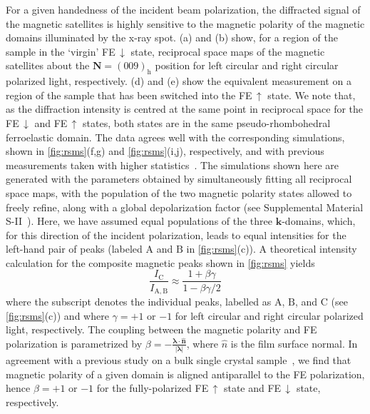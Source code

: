 \documentclass[aps,prb,twocolumn,showpacs,superscriptaddress, longbibliography, 10pt]{revtex4-1}
\begin{document}
{For a given handedness of the incident beam polarization, the diffracted signal of the magnetic satellites is highly sensitive to the magnetic polarity of the magnetic domains illuminated by the x-ray spot. (a) and (b) show, for a region of the sample in the `virgin' FE\,$\downarrow$ state, reciprocal space maps of the magnetic satellites about the $\mathbf{N}=(009)_\mathrm{h}$ position for left circular and right circular polarized light, respectively. (d) and (e) show the equivalent measurement on a region of the sample that has been switched into the FE\,$\uparrow$ state. We note that, as the diffraction intensity is centred at the same point in reciprocal space for the FE\,$\downarrow$ and FE\,$\uparrow$ states, both states are in the same pseudo-rhombohedral ferroelastic domain. The data agrees well with the corresponding simulations, shown in \cref{fig:rsms}(f,g) and \cref{fig:rsms}(i,j), respectively, and with previous measurements taken with higher statistics~\cite{waterfieldprice2016coherent}. The simulations shown here are generated with the parameters obtained by simultaneously fitting all reciprocal space maps, with the population of the two magnetic polarity states allowed to freely refine, along with a global depolarization factor (see Supplemental Material S-II~\cite{Suppl}). Here, we have assumed equal populations of the three $\textbf{k}$-domains, which, for this direction of the incident polarization, leads to equal intensities for the left-hand pair of peaks (labeled  $\mathrm{A}$ and $\mathrm{B}$ in \cref{fig:rsms}(c)). A theoretical intensity calculation for the composite magnetic peaks shown in \cref{fig:rsms} yields
\begin{equation}
  \frac{I_\mathrm{C}}{I_{\mathrm{A}, \mathrm{B}}} \approx \frac{1 + \beta\gamma}{1 - \beta\gamma/2}
\end{equation}
where the subscript denotes the individual peaks, labelled as  $\mathrm{A}$, $\mathrm{B}$, and $\mathrm{C}$ (see \cref{fig:rsms}(c)) and
where $\gamma = +1$ or $-1$ for left circular and right circular polarized light, respectively. The coupling between the magnetic polarity and FE polarization is parametrized by $\beta = - \frac{\boldsymbol{\lambda} \cdot \hat{\mathbf{n}}}{|\boldsymbol{\lambda}|}$, where $\hat{n}$ is the film surface normal. In agreement with a previous study on a bulk single crystal sample~\cite{johnson2013x}, we find that magnetic polarity of a given domain is aligned antiparallel to the FE polarization, hence $\beta = +1$ or $-1$ for the fully-polarized FE\,$\uparrow$ state and FE\,$\downarrow$ state, respectively.

}
\end{document}
